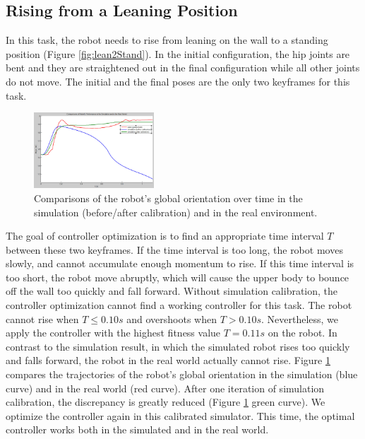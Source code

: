 \subsection{Rising from a Leaning Position}

In this task, the robot needs to rise from leaning on the wall to a standing position (Figure \ref{fig:lean2Stand}). In the initial configuration, the hip joints are bent and they are straightened out in the final configuration while all other joints do not move. The initial and the final poses are the only two keyframes for this task.

\begin{figure}[!b]
  \centering
  \includegraphics[width=0.4\textwidth]{figures/simRobotCompare}
  \caption{Comparisons of the robot's global orientation over time in the simulation (before/after calibration) and in the real environment.}
  \label{fig:simRobotCompare}
\end{figure}


The goal of controller optimization is to find an appropriate time interval $T$ between these two keyframes. If the time interval is too long, the robot moves slowly, and cannot accumulate enough momentum to rise. If this time interval is too short, the robot move abruptly, which will cause the upper body to bounce off the wall too quickly and fall forward. Without simulation calibration, the controller optimization cannot find a working controller for this task. The robot cannot rise when $T\leq 0.10s$ and overshoots when $T > 0.10s$. Nevertheless, we apply the controller with the highest fitness value $T=0.11s$ on the robot. In contrast to the simulation result, in which the simulated robot rises too quickly and falls forward, the robot in the real world actually cannot rise. Figure \ref{fig:simRobotCompare} compares the trajectories of the robot's global orientation in the simulation (blue curve) and in the real world (red curve). After one iteration of simulation calibration, the discrepancy is greatly reduced (Figure \ref{fig:simRobotCompare} green curve). We optimize the controller again in this calibrated simulator. This time, the optimal controller works both in the simulated and in the real world.

